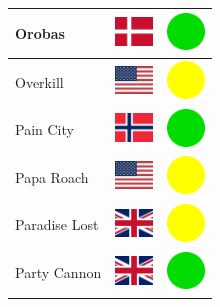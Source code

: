 \documentclass[12pt, a4paper, twoside]{report}
\begin{document}
\begin{center}
\begin{longtable}{|p{5cm}|p{2cm}|p{2cm}|}
 Orobas                                                     & \includegraphics[width=1cm]{4x3/dk} &   \includegraphics[width=1cm]{likes/y} \\ \hline
 Overkill                                                   & \includegraphics[width=1cm]{4x3/us} &   \includegraphics[width=1cm]{likes/m} \\ \hline
 Pain City                                                  & \includegraphics[width=1cm]{4x3/no} &   \includegraphics[width=1cm]{likes/y} \\ \hline
 Papa Roach                                                 & \includegraphics[width=1cm]{4x3/us} &   \includegraphics[width=1cm]{likes/m} \\ \hline
 Paradise Lost                                              & \includegraphics[width=1cm]{4x3/gb} &   \includegraphics[width=1cm]{likes/m} \\ \hline
 Party Cannon                                               & \includegraphics[width=1cm]{4x3/gb} &   \includegraphics[width=1cm]{likes/y} \\ \hline

\end{longtable}
\end{center}
\end{document}
